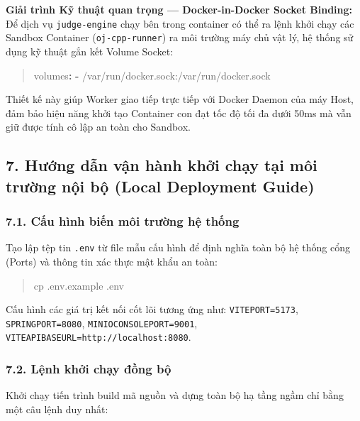 \documentclass[12pt,a4paper]{article}
\renewcommand{\_}{\BreakableUnderscore}
\newenvironment{Shaded}{\vspace{3pt}\begin{quote}}{\end{quote}\vspace{3pt}}
\newcommand{\AttributeTok}[1]{\textcolor[rgb]{0.49,0.56,0.16}{#1}}
\newcommand{\FunctionTok}[1]{\textcolor[rgb]{0.02,0.16,0.49}{#1}}
\newcommand{\KeywordTok}[1]{\textcolor[rgb]{0.00,0.44,0.13}{\textbf{#1}}}
\newcommand{\NormalTok}[1]{#1}
\begin{document}
\textbf{Giải trình Kỹ thuật quan trọng --- Docker-in-Docker Socket Binding:} Để dịch vụ \texttt{judge-engine} chạy bên trong container có thể ra lệnh khởi chạy các Sandbox Container (\texttt{oj-cpp-runner}) ra môi trường máy chủ vật lý, hệ thống sử dụng kỹ thuật gắn kết Volume Socket:

\begin{Shaded}
\begin{Highlighting}[]
\FunctionTok{volumes}\KeywordTok{:}
\AttributeTok{  }\KeywordTok{{-}}\AttributeTok{ /var/run/docker.sock:/var/run/docker.sock}
\end{Highlighting}
\end{Shaded}

Thiết kế này giúp Worker giao tiếp trực tiếp với Docker Daemon của máy Host, đảm bảo hiệu năng khởi tạo Container con đạt tốc độ tối đa dưới 50ms mà vẫn giữ được tính cô lập an toàn cho Sandbox.

\subsection{7. Hướng dẫn vận hành khởi chạy tại môi trường nội bộ (Local Deployment Guide)}

\subsubsection{7.1. Cấu hình biến môi trường hệ thống}

Tạo lập tệp tin \texttt{.env} từ file mẫu cấu hình để định nghĩa toàn bộ hệ thống cổng (Ports) và thông tin xác thực mật khẩu an toàn:

\begin{Shaded}
\begin{Highlighting}[]
\FunctionTok{cp}\NormalTok{ .env.example .env}
\end{Highlighting}
\end{Shaded}

Cấu hình các giá trị kết nối cốt lõi tương ứng như: \texttt{VITE\_PORT=5173}, \texttt{SPRING\_PORT=8080}, \texttt{MINIO\_CONSOLE\_PORT=9001}, \texttt{VITE\_API\_BASE\_URL=http://localhost:8080}.

\subsubsection{7.2. Lệnh khởi chạy đồng bộ}

Khởi chạy tiến trình build mã nguồn và dựng toàn bộ hạ tầng ngầm chỉ bằng một câu lệnh duy nhất:
\end{document}
